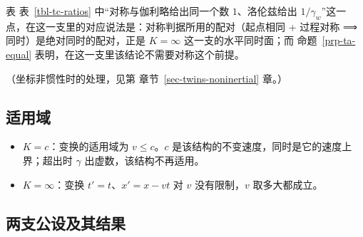 \documentclass[
  chinese,
  a4paper,
  UTF8,
  12pt,
  oneside,
  openany]{ctexbook}
\providecommand{\tightlist}{%
  \setlength{\itemsep}{0pt}\setlength{\parskip}{0pt}}
\theoremstyle{plain}
\theoremstyle{plain}
\theoremstyle{plain}
\theoremstyle{definition}
\theoremstyle{plain}
\theoremstyle{plain}
\theoremstyle{remark}
\begin{document}
表 表~\ref{tbl-tc-ratios} 中``对称与伽利略给出同一个数 \(1\)、洛伦兹给出
\(1/\gamma_w\)''这一点，在这一支里的对应说法是：对称判据所用的配对（起点相同
+ 过程对称 ⟹ 同时）是绝对同时的配对，正是 \(K=\infty\)
这一支的水平同时面；而 命题~\ref{prp-ta-equal}
表明，在这一支里该结论不需要对称这个前提。

（坐标非惯性时的处理，见第 章节~\ref{sec-twins-noninertial} 章。）

\subsection{适用域}\label{sec-ta-domain}

\begin{itemize}
\tightlist
\item
  \textbf{\(K=c\)}：变换的适用域为 \(v\le c\)。\(c\)
  是该结构的不变速度，同时是它的速度上界；超出时 \(\gamma\)
  出虚数，该结构不再适用。
\item
  \textbf{\(K=\infty\)}：变换 \(t'=t\)、\(x'=x-vt\) 对 \(v\)
  没有限制，\(v\) 取多大都成立。
\end{itemize}

\subsection{两支公设及其结果}\label{sec-ta-conclusion}
\end{document}
